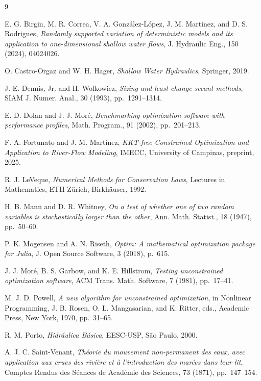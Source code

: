 \documentclass[11pt]{article}
\begin{document}
\clearpage
\begin{thebibliography}{9}

E. G. Birgin, M. R. Correa, V. A. Gonz\'alez-L\'opez, J. M. Mart\'inez, and
D. S. Rodrigues, \emph{Randomly supported variation of deterministic
models and its application to one-dimensional shallow water flows}, J.
Hydraulic Eng., 150 (2024), 04024026.

O. Castro-Orgaz and W. H. Hager, \emph{Shallow Water Hydraulics},
Springer, 2019.

J. E. Dennis, Jr. and H. Wolkowicz, \emph{Sizing and least-change secant
methods}, SIAM J. Numer. Anal., 30 (1993), pp.~1291--1314.

E. D. Dolan and J. J. Mor\'e, \emph{Benchmarking optimization software
with performance profiles}, Math. Program., 91 (2002), pp.~201--213.

F. A. Fortunato and J. M. Mart\'inez, \emph{KKT-free Constrained
Optimization and Application to River-Flow Modeling}, IMECC, University
of Campinas, preprint, 2025.

R. J. LeVeque, \emph{Numerical Methods for Conservation Laws}, Lectures
in Mathematics, ETH Z\"urich, Birkh\"auser, 1992.

H. B. Mann and D. R. Whitney, \emph{On a test of whether one of two random
variables is stochastically larger than the other}, Ann. Math. Statist.,
18 (1947), pp.~50--60.

P. K. Mogensen and A. N. Riseth, \emph{Optim: A mathematical optimization
package for Julia}, J. Open Source Software, 3 (2018), p.~615.

J. J. Mor\'e, B. S. Garbow, and K. E. Hillstrom, \emph{Testing
unconstrained optimization software}, ACM Trans. Math. Software, 7 (1981),
pp.~17--41.

M. J. D. Powell, \emph{A new algorithm for unconstrained optimization}, in
Nonlinear Programming, J. B. Rosen, O. L. Mangasarian, and K. Ritter, eds.,
Academic Press, New York, 1970, pp.~31--65.

R. M. Porto, \emph{Hidr\'aulica B\'asica}, EESC-USP, S\~ao Paulo, 2000.

A. J. C. Saint-Venant, \emph{Th\'eorie du mouvement non-permanent des
eaux, avec application aux crues des rivi\`ere et \`a l'introduction des
mar\'ees dans leur lit}, Comptes Rendus des S\'eances de Acad\'emie des
Sciences, 73 (1871), pp.~147--154.

\end{thebibliography}
\end{document}
